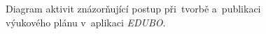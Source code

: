 \documentclass[male,czech,api_bc]{kitheses}
\begin{document}
\begin{figure}[H]
	\centering
	\caption{Diagram aktivit znázorňující postup při~tvorbě a~publikaci výukového plánu v~aplikaci \textit{EDUBO}.}
	\label{fig:activity-diagram}
\end{figure}
\end{document}

